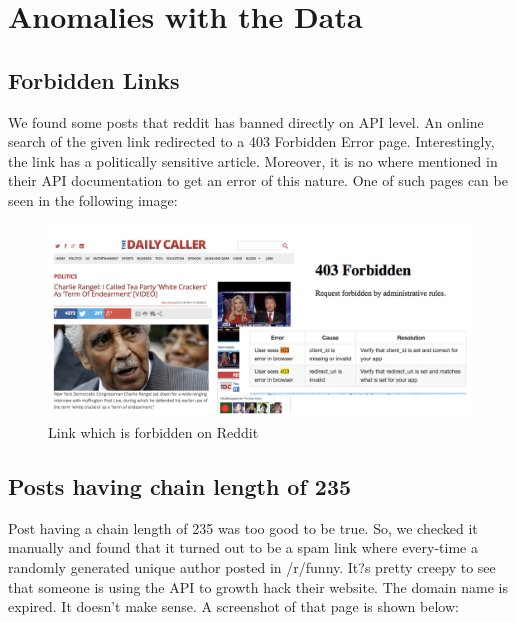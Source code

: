 \documentclass{article} %
\begin{document}
\newpage


\section{Anomalies with the Data}

\subsection{Forbidden Links}

We found some posts that reddit has banned directly on API level. An online search of the given link redirected to a 403 Forbidden Error page. Interestingly, the link has a politically sensitive article. Moreover, it is no where mentioned in their API documentation to get an error of this nature. One of such pages can be seen in the following image:

\begin{figure}[h]
\begin{center}
\includegraphics[width=4.6in]{pol.png}
\caption{Link which is forbidden on Reddit}
\end{center}
\end{figure}

\subsection{Posts having chain length of 235}

Post having a chain length of 235 was too good to be true. So, we checked it manually and found that it turned out to be a spam link where every-time a randomly generated unique author posted in /r/funny. It?s pretty creepy to see that someone is using the API to growth hack their website.  The domain name is expired. It doesn't make sense. A screenshot of that page is shown below:
\end{document}
